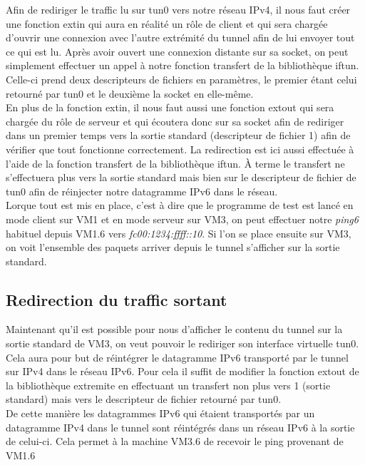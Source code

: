 \documentclass[a4paper, 12pt]{article}
\begin{document}
    Afin de rediriger le traffic lu sur tun0 vers notre réseau IPv4, il nous
    faut créer une fonction extin qui aura en réalité un rôle de client et qui
    sera chargée d'ouvrir une connexion avec l'autre extrémité du tunnel afin
    de lui envoyer tout ce qui est lu. Après avoir ouvert une connexion 
    distante sur sa socket, on peut simplement effectuer un appel à notre 
    fonction transfert de la bibliothèque iftun. Celle-ci prend deux 
    descripteurs de fichiers en paramètres, le premier étant celui retourné par
    tun0 et le deuxième la socket en elle-même. \\

    En plus de la fonction extin, il nous faut aussi une fonction extout qui 
    sera chargée du rôle de serveur et qui écoutera donc sur sa socket afin de 
    rediriger dans un premier temps vers la sortie standard (descripteur de 
    fichier 1) afin de vérifier que tout fonctionne correctement. La 
    redirection est ici aussi effectuée à l'aide de la fonction transfert de la
    bibliothèque iftun. À terme le transfert ne s'effectuera plus vers la sortie 
    standard mais bien sur le descripteur de fichier de tun0 afin de réinjecter
    notre datagramme IPv6 dans le réseau. \\

    Lorque tout est  mis en place, c'est à dire que le programme de test est
    lancé en mode client sur VM1 et en mode serveur sur VM3, on peut effectuer 
    notre \textit{ping6} habituel depuis VM1.6 vers 
    \textit{fc00:1234:ffff::10}. Si l'on se place ensuite sur VM3, on voit 
    l'ensemble des paquets arriver depuis le tunnel s'afficher sur la sortie
    standard.

    \subsection{Redirection du traffic sortant}

    Maintenant qu'il est possible pour nous d'afficher le contenu du tunnel
    sur la sortie standard de VM3, on veut pouvoir le rediriger son interface
    virtuelle tun0. Cela aura pour but de réintégrer le datagramme IPv6
    transporté par le tunnel sur IPv4 dans le réseau IPv6. Pour cela il suffit
    de modifier la fonction extout de la bibliothèque extremite en effectuant
    un transfert non plus vers 1 (sortie standard) mais vers le descripteur de
    fichier retourné par tun0. \\

    De cette manière les datagrammes IPv6 qui étaient transportés par un 
    datagramme IPv4 dans le tunnel sont réintégrés dans un réseau IPv6 à la 
    sortie de celui-ci. Cela permet à la machine VM3.6 de recevoir le ping 
    provenant de VM1.6
\end{document}
